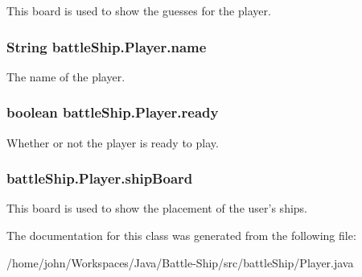 This board is used to show the guesses for the player. 

\hypertarget{classbattleShip_1_1Player_a0be29098278ff1ccb8ebac1fc08546c2}{
\subsubsection[{name}]{\setlength{\rightskip}{0pt plus 5cm}String battle\-Ship.\-Player.\-name\hspace{0.3cm}{\ttfamily [protected]}}}\label{classbattleShip_1_1Player_a0be29098278ff1ccb8ebac1fc08546c2}


The name of the player. 

\hypertarget{classbattleShip_1_1Player_aeeb80baff53736294a7e406b8d19e1ac}{
\subsubsection[{ready}]{\setlength{\rightskip}{0pt plus 5cm}boolean battle\-Ship.\-Player.\-ready\hspace{0.3cm}{\ttfamily [protected]}}}\label{classbattleShip_1_1Player_aeeb80baff53736294a7e406b8d19e1ac}


Whether or not the player is ready to play. 

\hypertarget{classbattleShip_1_1Player_a57e76a8f3bb9739c402cad1f2eb1205a}{
\subsubsection[{ship\-Board}]{ battle\-Ship.\-Player.\-ship\-Board\hspace{0.3cm}{\ttfamily [protected]}}}\label{classbattleShip_1_1Player_a57e76a8f3bb9739c402cad1f2eb1205a}


This board is used to show the placement of the user's ships. 



The documentation for this class was generated from the following file\-:\begin{DoxyCompactItemize}
\item 
/home/john/\-Workspaces/\-Java/\-Battle-\/\-Ship/src/battle\-Ship/Player.\-java\end{DoxyCompactItemize}
